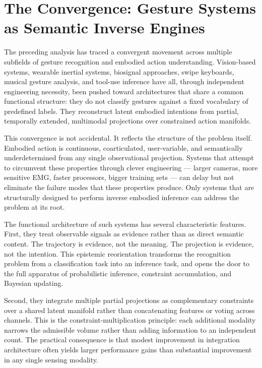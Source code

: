\documentclass[11pt, a4paper]{article}
\theoremstyle{definition}
\begin{document}
\section{The Convergence: Gesture Systems as Semantic Inverse Engines}

The preceding analysis has traced a convergent movement across multiple subfields of gesture recognition and embodied action understanding. Vision-based systems, wearable inertial systems, biosignal approaches, swipe keyboards, musical gesture analysis, and tool-use inference have all, through independent engineering necessity, been pushed toward architectures that share a common functional structure: they do not classify gestures against a fixed vocabulary of predefined labels. They reconstruct latent embodied intentions from partial, temporally extended, multimodal projections over constrained action manifolds.

This convergence is not accidental. It reflects the structure of the problem itself. Embodied action is continuous, coarticulated, user-variable, and semantically underdetermined from any single observational projection. Systems that attempt to circumvent these properties through clever engineering --- larger cameras, more sensitive EMG, faster processors, bigger training sets --- can delay but not eliminate the failure modes that these properties produce. Only systems that are structurally designed to perform inverse embodied inference can address the problem at its root.

The functional architecture of such systems has several characteristic features. First, they treat observable signals as evidence rather than as direct semantic content. The trajectory is evidence, not the meaning. The projection is evidence, not the intention. This epistemic reorientation transforms the recognition problem from a classification task into an inference task, and opens the door to the full apparatus of probabilistic inference, constraint accumulation, and Bayesian updating.

Second, they integrate multiple partial projections as complementary constraints over a shared latent manifold rather than concatenating features or voting across channels. This is the constraint-multiplication principle: each additional modality narrows the admissible volume rather than adding information to an independent count. The practical consequence is that modest improvement in integration architecture often yields larger performance gains than substantial improvement in any single sensing modality.
\end{document}
